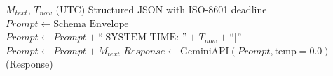 \begin{algorithm}[htbp]
\caption{Temporal Anchoring Extraction}
\label{alg:temporal_anchoring}
\begin{algorithmic}[1]
\REQUIRE $M_{text}$, $T_{now}$ (UTC)
\ENSURE Structured JSON with ISO-8601 deadline
\STATE $Prompt \leftarrow \text{Schema Envelope}$
\STATE $Prompt \leftarrow Prompt + \text{``[SYSTEM TIME: ''} + T_{now} + \text{``]''}$
\STATE $Prompt \leftarrow Prompt + M_{text}$
\STATE $Response \leftarrow \text{GeminiAPI}(Prompt, \text{temp}=0.0)$
\RETURN {}(Response)
\end{algorithmic}
\end{algorithm}
